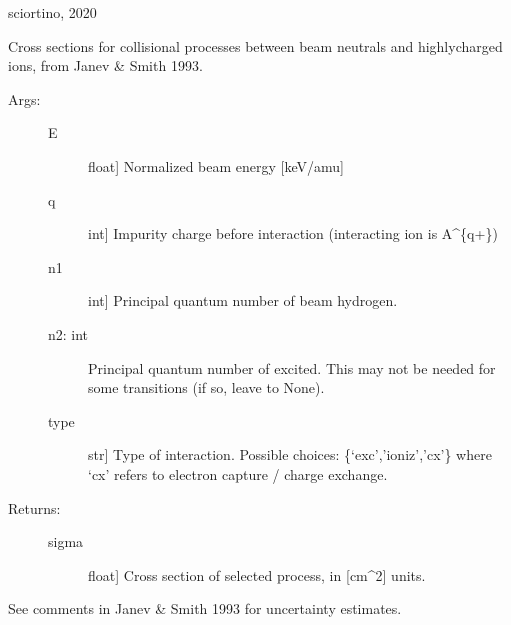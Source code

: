 \documentclass[letterpaper,10pt,english]{sphinxmanual}
\begin{document}
sciortino, 2020

\begin{fulllineitems}
\label{\detokenize{aurora:aurora.janev_smith_rates.js_sigma}}
Cross sections for collisional processes between beam neutrals and highly\sphinxhyphen{}charged 
ions, from Janev \& Smith 1993.
\begin{description}
\item[{Args:}] \leavevmode\begin{description}
\item[{E}] \leavevmode{[}float{]}
Normalized beam energy {[}keV/amu{]}

\item[{q}] \leavevmode{[}int{]}
Impurity charge before interaction (interacting ion is A\textasciicircum{}\{q+\})

\item[{n1}] \leavevmode{[}int{]}
Principal quantum number of beam hydrogen.

\item[{n2: int}] \leavevmode
Principal quantum number of excited. This may not be needed for some transitions (if so, leave to None).

\item[{type}] \leavevmode{[}str{]}
Type of interaction. Possible choices:
\{‘exc’,’ioniz’,’cx’\}
where ‘cx’ refers to electron capture / charge exchange.

\end{description}

\item[{Returns:}] \leavevmode\begin{description}
\item[{sigma}] \leavevmode{[}float{]}
Cross section of selected process, in {[}cm\textasciicircum{}2{]} units.

\end{description}

\end{description}

See comments in Janev \& Smith 1993 for uncertainty estimates.

\end{fulllineitems}
\end{document}
